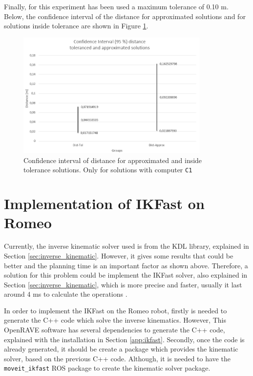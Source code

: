\documentclass[12pt,a4paper,final,twoside,openright]{report}
\begin{document}
Finally, for this experiment has been used a maximum tolerance of 0.10 m. Below, the confidence interval of the distance for approximated solutions and for solutions inside tolerance are shown in Figure \ref{fig:exp_conf_int_dist_approx_tol}.

\begin{figure}[!h]
\centering
\includegraphics[width=0.85\textwidth]{images/dist_graph.png}
\caption{Confidence interval of distance for approximated and inside tolerance solutions. Only for solutions with computer \texttt{C1}\label{fig:exp_conf_int_dist_approx_tol}}
\end{figure}


\section{Implementation of IKFast on Romeo}
\label{sec:exp_ikfast}

Currently, the inverse kinematic solver used is from the KDL library, explained in Section \ref{sec:inverse_kinematic}. However, it gives some results that could be better and the planning time is an important factor as shown above. Therefore, a solution for this problem could be implement the IKFast solver, also explained in Section \ref{sec:inverse_kinematic}, which is more precise and faster, usually it last around 4 ms to calculate the operations \cite{Diankov2010}. 

In order to implement the IKFast on the Romeo robot, firstly is needed to generate the C++ code which solve the inverse kinematics. However, This OpenRAVE software has several dependencies to generate the C++ code, explained with the installation in Section \ref{app:ikfast}. Secondly, once the code is already generated, it should be create a package which provides the kinematic solver, based on the previous C++ code. Although, it is needed to have the \texttt{moveit\_ikfast} ROS package to create the kinematic solver package. 
\end{document}
